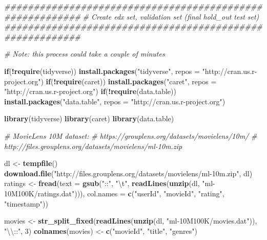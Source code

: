 \documentclass[
]{article}
\newenvironment{Shaded}{\begin{snugshade}}{\end{snugshade}}
\newcommand{\CharTok}[1]{\textcolor[rgb]{0.31,0.60,0.02}{#1}}
\newcommand{\CommentTok}[1]{\textcolor[rgb]{0.56,0.35,0.01}{\textit{#1}}}
\newcommand{\ControlFlowTok}[1]{\textcolor[rgb]{0.13,0.29,0.53}{\textbf{#1}}}
\newcommand{\DataTypeTok}[1]{\textcolor[rgb]{0.13,0.29,0.53}{#1}}
\newcommand{\DecValTok}[1]{\textcolor[rgb]{0.00,0.00,0.81}{#1}}
\newcommand{\KeywordTok}[1]{\textcolor[rgb]{0.13,0.29,0.53}{\textbf{#1}}}
\newcommand{\NormalTok}[1]{#1}
\newcommand{\OperatorTok}[1]{\textcolor[rgb]{0.81,0.36,0.00}{\textbf{#1}}}
\newcommand{\StringTok}[1]{\textcolor[rgb]{0.31,0.60,0.02}{#1}}
\begin{document}
\begin{Shaded}
\begin{Highlighting}[]
\CommentTok{#########################################################}
\CommentTok{# Create edx set, validation set (final hold_out test set)}
\CommentTok{#########################################################}

\CommentTok{# Note: this process could take a couple of minutes}

\ControlFlowTok{if}\NormalTok{(}\OperatorTok{!}\KeywordTok{require}\NormalTok{(tidyverse)) }\KeywordTok{install.packages}\NormalTok{(}\StringTok{"tidyverse"}\NormalTok{, }\DataTypeTok{repos =} \StringTok{"http://cran.us.r-project.org"}\NormalTok{)}
\ControlFlowTok{if}\NormalTok{(}\OperatorTok{!}\KeywordTok{require}\NormalTok{(caret)) }\KeywordTok{install.packages}\NormalTok{(}\StringTok{"caret"}\NormalTok{, }\DataTypeTok{repos =} \StringTok{"http://cran.us.r-project.org"}\NormalTok{)}
\ControlFlowTok{if}\NormalTok{(}\OperatorTok{!}\KeywordTok{require}\NormalTok{(data.table)) }\KeywordTok{install.packages}\NormalTok{(}\StringTok{"data.table"}\NormalTok{, }\DataTypeTok{repos =} \StringTok{"http://cran.us.r-project.org"}\NormalTok{)}

\KeywordTok{library}\NormalTok{(tidyverse)}
\KeywordTok{library}\NormalTok{(caret)}
\KeywordTok{library}\NormalTok{(data.table)}

\CommentTok{# MovieLens 10M dataset:}
\CommentTok{# https://grouplens.org/datasets/movielens/10m/}
\CommentTok{# http://files.grouplens.org/datasets/movielens/ml-10m.zip}

\NormalTok{dl <-}\StringTok{ }\KeywordTok{tempfile}\NormalTok{()}
\KeywordTok{download.file}\NormalTok{(}\StringTok{"http://files.grouplens.org/datasets/movielens/ml-10m.zip"}\NormalTok{, dl)}
\NormalTok{ratings <-}\StringTok{ }\KeywordTok{fread}\NormalTok{(}\DataTypeTok{text =} \KeywordTok{gsub}\NormalTok{(}\StringTok{"::"}\NormalTok{, }\StringTok{"}\CharTok{\textbackslash{}t}\StringTok{"}\NormalTok{, }\KeywordTok{readLines}\NormalTok{(}\KeywordTok{unzip}\NormalTok{(dl, }\StringTok{"ml-10M100K/ratings.dat"}\NormalTok{))),}
                 \DataTypeTok{col.names =} \KeywordTok{c}\NormalTok{(}\StringTok{"userId"}\NormalTok{, }\StringTok{"movieId"}\NormalTok{, }\StringTok{"rating"}\NormalTok{, }\StringTok{"timestamp"}\NormalTok{))}

\NormalTok{movies <-}\StringTok{ }\KeywordTok{str_split_fixed}\NormalTok{(}\KeywordTok{readLines}\NormalTok{(}\KeywordTok{unzip}\NormalTok{(dl, }\StringTok{"ml-10M100K/movies.dat"}\NormalTok{)), }\StringTok{"}\CharTok{\textbackslash{}\textbackslash{}}\StringTok{::"}\NormalTok{, }\DecValTok{3}\NormalTok{)}
\KeywordTok{colnames}\NormalTok{(movies) <-}\StringTok{ }\KeywordTok{c}\NormalTok{(}\StringTok{"movieId"}\NormalTok{, }\StringTok{"title"}\NormalTok{, }\StringTok{"genres"}\NormalTok{)}


\end{Highlighting}
\end{Shaded}
\end{document}
